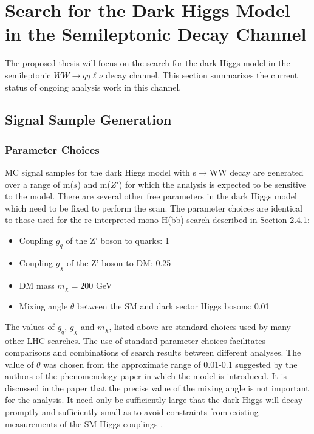 \documentclass[12pt]{article}
\begin{document}
\section{Search for the Dark Higgs Model in the Semileptonic Decay Channel}

The proposed thesis will focus on the search for the dark Higgs model in the semileptonic $WW\rightarrow qq\ell\nu$ decay channel. This section summarizes the current status of ongoing analysis work in this channel. 

\subsection{Signal Sample Generation}

\subsubsection{Parameter Choices}

MC signal samples for the dark Higgs model with s$\rightarrow$WW decay are generated over a range of m($s$) and m($Z'$) for which the analysis is expected to be sensitive to the model. There are several other free parameters in the dark Higgs model which need to be fixed to perform the scan. The parameter choices are identical to those used for the re-interpreted mono-H(bb) search described in Section 2.4.1:

\begin{itemize}
	\item Coupling $g_{q}$ of the Z' boson to quarks: 1 
	\item Coupling $g_{\chi}$ of the Z' boson to DM: 0.25
	\item DM mass $m_{\chi} = 200$ GeV
	\item Mixing angle $\theta$ between the SM and dark sector Higgs bosons: 0.01
\end{itemize}

The values of $g_q$, $g_\chi$ and $m_\chi$, listed above are standard choices used by many other LHC searches. The use of standard parameter choices facilitates comparisons and combinations of search results between different analyses. The value of $\theta$ was chosen from the approximate range of 0.01-0.1 suggested by the authors of the phenomenology paper \cite{dark_Higgs} in which the model is introduced. It is discussed in the paper that the precise value of the mixing angle is not important for the analysis. It need only be sufficiently large that the dark Higgs will decay promptly and sufficiently small as to avoid constraints from existing measurements of the SM Higgs couplings \cite{Aad_2016}. 
\end{document}
